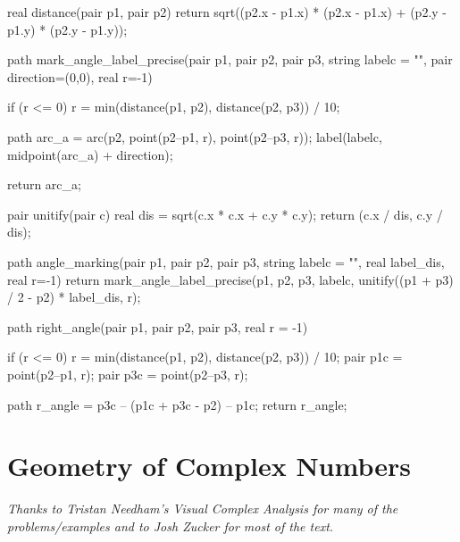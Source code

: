 \documentclass[../gatm.tex]{subfiles}
\begin{document}

\begin{asydef}
	
	
	real distance(pair p1, pair p2) {
		return sqrt((p2.x - p1.x) * (p2.x - p1.x) + (p2.y - p1.y) * (p2.y - p1.y));
	}
	
	path mark_angle_label_precise(pair p1, pair p2, pair p3, string labelc = "", pair direction=(0,0), real r=-1) {
		if (r <= 0) {
			r = min(distance(p1, p2), distance(p2, p3)) / 10;
		}
		
		path arc_a = arc(p2, point(p2--p1, r), point(p2--p3, r));
		label(labelc, midpoint(arc_a) + direction);
		
		return arc_a;
	}
	
	pair unitify(pair c) {
		real dis = sqrt(c.x * c.x + c.y * c.y);
		return (c.x / dis, c.y / dis);
	}
	
	path angle_marking(pair p1, pair p2, pair p3, string labelc = "", real label_dis, real r=-1) {
		return mark_angle_label_precise(p1, p2, p3, labelc, unitify((p1 + p3) / 2 - p2) * label_dis, r);
	}
	
	path right_angle(pair p1, pair p2, pair p3, real r = -1) {
		if (r <= 0) {
			r = min(distance(p1, p2), distance(p2, p3)) / 10;
		}
		pair p1c = point(p2--p1, r);
		pair p3c = point(p2--p3, r);
		
		path r_angle = p3c -- (p1c + p3c - p2) -- p1c;
		return r_angle;
	}
	
\end{asydef}

\section{Geometry of Complex Numbers}

\noindent\textit{Thanks to Tristan Needham's \emph{Visual Complex Analysis} for many of the problems/examples and to Josh Zucker for most of the text.}
\end{document}
